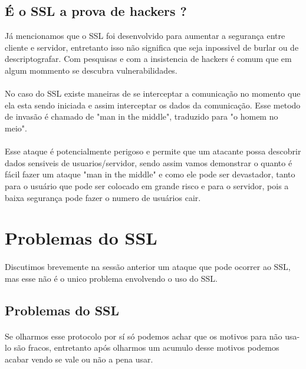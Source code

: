 \documentclass{article}
\begin{document}
  \subsection{É o SSL a prova de hackers ?}
    Já mencionamos que o SSL foi desenvolvido para aumentar a segurança entre
  cliente e servidor, entretanto isso não significa que seja inpossivel de
  burlar ou de descriptografar. Com pesquisas e com a insistencia de hackers é
  comum que em algum mommento se descubra vulnerabilidades.
  \paragraph{}
    No caso do SSL existe maneiras de se interceptar a comunicação no momento
  que ela esta sendo iniciada e assim interceptar os dados da comunicação. Esse
  metodo de invasão é chamado de "man in the middle", traduzido para "o homem
  no meio".
  \paragraph{}
    Esse ataque é potencialmente perigoso e permite que um atacante possa
  descobrir dados sensiveis de usuarios/servidor, sendo assim vamos demonstrar
  o quanto é fácil fazer um ataque "man in the middle" e como ele pode ser
  devastador, tanto para o usuário que pode ser colocado em grande risco e
  para o servidor, pois a baixa segurança pode fazer o numero de usuários cair.

  \newpage

  \section{Problemas do SSL}
  \paragraph{}
    Discutimos brevemente na sessão anterior um ataque que pode ocorrer ao SSL,
  mas esse não é o unico problema envolvendo o uso do SSL.

  \subsection{Problemas do SSL}
  \paragraph{}
  Se olharmos esse protocolo por sí só podemos achar que os motivos para não
  usa-lo são fracos, entretanto após olharmos um acumulo desse motivos podemos
  acabar vendo se vale ou não a pena usar.
\end{document}
